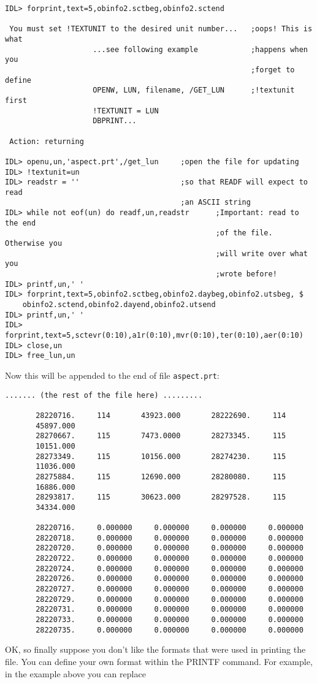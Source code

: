 \medskip\noindent
\begin{verbatim}
IDL> forprint,text=5,obinfo2.sctbeg,obinfo2.sctend
 
 You must set !TEXTUNIT to the desired unit number...   ;oops! This is what
                    ...see following example            ;happens when you
                                                        ;forget to define
                    OPENW, LUN, filename, /GET_LUN      ;!textunit first
                    !TEXTUNIT = LUN
                    DBPRINT...
 
 Action: returning
 
IDL> openu,un,'aspect.prt',/get_lun     ;open the file for updating
IDL> !textunit=un
IDL> readstr = ''                       ;so that READF will expect to read
                                        ;an ASCII string
IDL> while not eof(un) do readf,un,readstr      ;Important: read to the end
                                                ;of the file. Otherwise you
                                                ;will write over what you
                                                ;wrote before!
IDL> printf,un,' '
IDL> forprint,text=5,obinfo2.sctbeg,obinfo2.daybeg,obinfo2.utsbeg, $
	obinfo2.sctend,obinfo2.dayend,obinfo2.utsend
IDL> printf,un,' '
IDL> forprint,text=5,sctevr(0:10),a1r(0:10),mvr(0:10),ter(0:10),aer(0:10)
IDL> close,un
IDL> free_lun,un
\end{verbatim}
Now this will be appended to the end of file {\tt aspect.prt}:

\medskip\noindent
\begin{verbatim}
....... (the rest of the file here) .........
 
       28220716.     114       43923.000       28222690.     114
       45897.000
       28270667.     115       7473.0000       28273345.     115
       10151.000
       28273349.     115       10156.000       28274230.     115
       11036.000
       28275884.     115       12690.000       28280080.     115
       16886.000
       28293817.     115       30623.000       28297528.     115
       34334.000
 
       28220716.     0.000000     0.000000     0.000000     0.000000
       28220718.     0.000000     0.000000     0.000000     0.000000
       28220720.     0.000000     0.000000     0.000000     0.000000
       28220722.     0.000000     0.000000     0.000000     0.000000
       28220724.     0.000000     0.000000     0.000000     0.000000
       28220726.     0.000000     0.000000     0.000000     0.000000
       28220727.     0.000000     0.000000     0.000000     0.000000
       28220729.     0.000000     0.000000     0.000000     0.000000
       28220731.     0.000000     0.000000     0.000000     0.000000
       28220733.     0.000000     0.000000     0.000000     0.000000
       28220735.     0.000000     0.000000     0.000000     0.000000
\end{verbatim}
OK, so finally suppose you don't like the formats that were used in printing
the file. You can define your own format within the PRINTF command. For
example, in the example above you can replace

